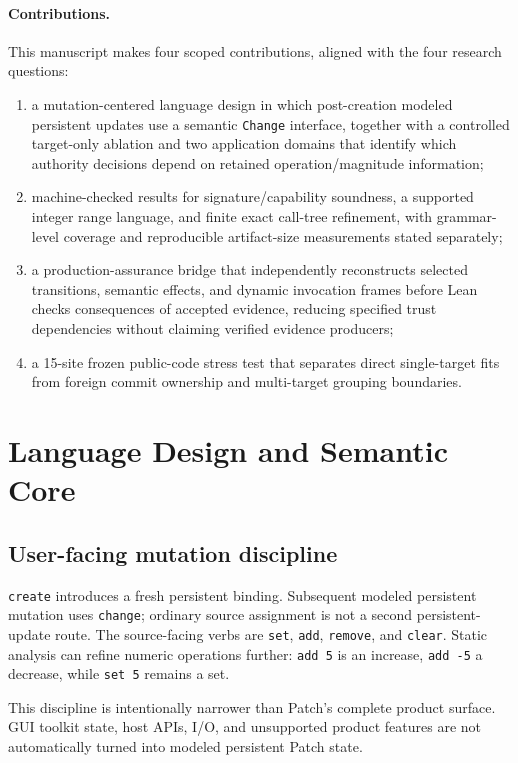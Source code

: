 \documentclass[10pt]{article}
\theoremstyle{plain}
\theoremstyle{remark}
\begin{document}
\paragraph{Contributions.}
This manuscript makes four scoped contributions, aligned with the four research questions:
\begin{enumerate}[leftmargin=*]
\item a mutation-centered language design in which post-creation modeled persistent updates use a semantic \texttt{Change} interface, together with a controlled target-only ablation and two application domains that identify which authority decisions depend on retained operation/magnitude information;
\item machine-checked results for signature/capability soundness, a supported integer range language, and finite exact call-tree refinement, with grammar-level coverage and reproducible artifact-size measurements stated separately;
\item a production-assurance bridge that independently reconstructs selected transitions, semantic effects, and dynamic invocation frames before Lean checks consequences of accepted evidence, reducing specified trust dependencies without claiming verified evidence producers;
\item a 15-site frozen public-code stress test that separates direct single-target fits from foreign commit ownership and multi-target grouping boundaries.
\end{enumerate}

\section{Language Design and Semantic Core}
\subsection{User-facing mutation discipline}
\texttt{create} introduces a fresh persistent binding. Subsequent modeled persistent mutation uses \texttt{change}; ordinary source assignment is not a second persistent-update route. The source-facing verbs are \texttt{set}, \texttt{add}, \texttt{remove}, and \texttt{clear}. Static analysis can refine numeric operations further: \texttt{add 5} is an increase, \texttt{add -5} a decrease, while \texttt{set 5} remains a set.

This discipline is intentionally narrower than Patch's complete product surface. GUI toolkit state, host APIs, I/O, and unsupported product features are not automatically turned into modeled persistent Patch state.
\end{document}
